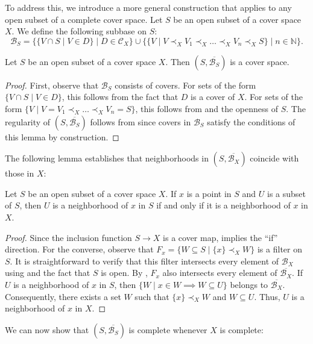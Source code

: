 \documentclass[reqno]{amsart}
\theoremstyle{definition}
\theoremstyle{remark}
\numberwithin{figure}{section}
\newcommand{\rb}{\prec}
\begin{document}
To address this, we introduce a more general construction that applies to any open subset of a complete cover space.
Let $S$ be an open subset of a cover space $X$.
We define the following subbase on $S$:
\[ \mathcal{B}_S = \{ \{ V \cap S \mid V \in D \} \mid D \in \mathcal{C}_X \} \cup \{ \{ V \mid V \rb_X V_1 \rb_X \ldots \rb_X V_n \rb_X S \} \mid n \in \mathbb{N} \}. \]

\begin{lem}
Let $S$ be an open subset of a cover space $X$.
Then $(S,\overline{\mathcal{B}_S})$ is a cover space.
\end{lem}
\begin{proof}
First, observe that $\mathcal{B}_S$ consists of covers.
For sets of the form $\{ V \cap S \mid V \in D \}$, this follows from the fact that $D$ is a cover of $X$.
For sets of the form $\{ V \mid V = V_1 \rb_X \ldots \rb_X V_n = S \}$, this follows from  and the openness of $S$.
The regularity of $(S,\overline{\mathcal{B}_S})$ follows from  since covers in $\mathcal{B}_S$ satisfy the conditions of this lemma by construction.
\end{proof}

The following lemma establishes that neighborhoods in $(S,\overline{\mathcal{B}_X})$ coincide with those in $X$:

\begin{lem}
Let $S$ be an open subset of a cover space $X$.
If $x$ is a point in $S$ and $U$ is a subset of $S$, then $U$ is a neighborhood of $x$ in $S$ if and only if it is a neighborhood of $x$ in $X$.
\end{lem}
\begin{proof}
Since the inclusion function $S \to X$ is a cover map,  implies the ``if'' direction.
For the converse, observe that $F_x = \{ W \subseteq S \mid \{ x \} \rb_X W \}$ is a filter on $S$.
It is straightforward to verify that this filter intersects every element of $\mathcal{B}_X$ using  and the fact that $S$ is open.
By , $F_x$ also intersects every element of $\overline{\mathcal{B}_X}$.
If $U$ is a neighborhood of $x$ in $S$, then $\{ W \mid x \in W \implies W \subseteq U \}$ belongs to $\overline{\mathcal{B}_X}$.
Consequently, there exists a set $W$ such that $\{ x \} \rb_X W$ and $W \subseteq U$.
Thus, $U$ is a neighborhood of $x$ in $X$.
\end{proof}

We can now show that $(S,\overline{\mathcal{B}_S})$ is complete whenever $X$ is complete:
\end{document}
